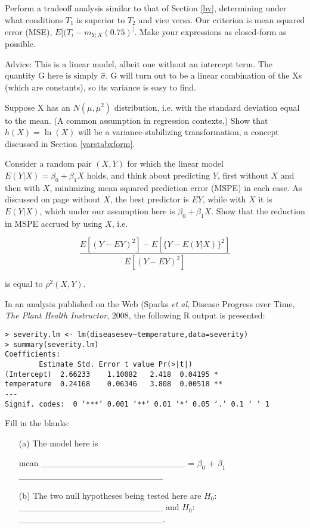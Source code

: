Perform a tradeoff analysis similar to that of Section \ref{bv},
determining under what conditions $T_1$ is superior to $T_2$ and vice versa. 
Our criterion is mean squared error (MSE), 
$E[(T_i - m_{Y;X}(0.75)^]$.
Make your expressions as closed-form as possible.

Advice: This is a linear model, albeit one without an intercept term.
The quantity G here is simply $\hat{\sigma}$.  G will turn out to be a
linear combination of the Xs (which are constants), so its variance is
easy to find.

\oneproblem
Suppose X has an $N(\mu,\mu^2)$ distribution, i.e. with the
standard deviation equal to the mean.  (A common assumption in
regression contexts.)  Show that $h(X) = \ln(X)$ will be a
variance-stabilizing transformation, a concept discussed in Section
\ref{varstabxform}.

\oneproblem
Consider a random pair $(X,Y)$ for which the linear model
$E(Y|X) = \beta_0 + \beta_1 X$ holds, and think about predicting $Y$,
first without $X$ and then with $X$, minimizing mean squared prediction
error (MSPE) in each case.  As discussed on page \pageref{optimpred}
without $X$, the best predictor is $EY$, while with $X$ it is $E(Y|X)$, 
which under our assumption here is $\beta_0 + \beta_1 X$.  Show that the
reduction in MSPE accrued by using $X$, i.e.

\begin{equation}
\frac
{E \left [(Y-EY)^2 \right ] - E \left [\{Y-E(Y|X)\}^2 \right ]}
{E \left [(Y-EY)^2 \right ]}
\end{equation}

is equal to $\rho^2(X,Y)$.

\oneproblem
In an analysis published on the Web (Sparks {\it et al},
Disease Progress over Time, {\it The Plant Health Instructor}, 2008,
the following R output is presented:

\begin{Verbatim}[fontsize=\relsize{-2}]
> severity.lm <- lm(diseasesev~temperature,data=severity)
> summary(severity.lm)
Coefficients:
        Estimate Std. Error t value Pr(>|t|)
(Intercept)  2.66233    1.10082   2.418  0.04195 *
temperature  0.24168    0.06346   3.808  0.00518 **
---
Signif. codes:  0 ‘***’ 0.001 ‘**’ 0.01 ‘*’ 0.05 ‘.’ 0.1 ‘ ’ 1
\end{Verbatim}

Fill in the blanks:

\begin{itemize}

\item [(a)] The model here is

mean
\_\_\_\_\_\_\_\_\_\_\_\_\_\_\_\_\_\_\_\_\_\_\_ =
$\beta_0$ + $\beta_1$
\_\_\_\_\_\_\_\_\_\_\_\_\_\_\_\_\_\_\_\_\_\_\_

\item [(b)] The two null hypotheses being tested here are
$H_0:$ \_\_\_\_\_\_\_\_\_\_\_\_\_\_\_\_\_\_\_\_\_\_\_ and
$H_0:$ \_\_\_\_\_\_\_\_\_\_\_\_\_\_\_\_\_\_\_\_\_\_\_.

\end{itemize}

